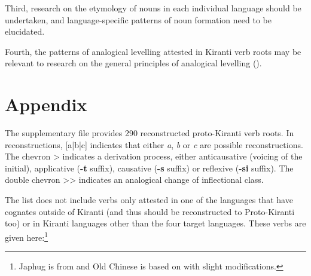 \documentclass[oneside,a4paper,11pt]{article}
\newcommand{\ipa}[1]{\textbf{{\phon\mbox{#1}}}} %
\begin{document}
Third, research on the etymology of nouns in each individual language should be undertaken, and language-specific patterns of noun formation need to be elucidated.


Fourth, the patterns of analogical levelling attested in Kiranti verb roots may be relevant to research on the general principles of analogical levelling (\citealt{hill07ausgleich, hill14conditioned,jacques16ebde}).


\section{Appendix} \label{sec:appendix}
The supplementary file provides 290 reconstructed proto-Kiranti verb roots. In reconstructions, [a|b|c] indicates that either \textit{a}, \textit{b} or \textit{c} are possible reconstructions. The chevron > indicates a derivation process, either anticausative (voicing of the initial), applicative (\ipa{-t} suffix), causative (\ipa{-s} suffix) or reflexive (\ipa{-si} suffix). The double chevron {>}{>} indicates an analogical change of inflectional class.

The list does not include verbs only attested in one of the languages that have cognates outside of Kiranti (and thus should be reconstructed to Proto-Kiranti too) or in Kiranti languages other than the four target languages. These verbs are given here:\footnote{Japhug is from \citet{jacques15japhug} and Old Chinese is based on \citealt{bs14oc} with slight modifications. }
\end{document}
